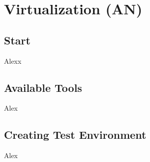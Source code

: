 \chapter{Virtualization (AN)}
\label{cha:Virtualization}



\section{Start}

Alexx

\section{Available Tools}

Alex

\section{Creating Test Environment}

Alex